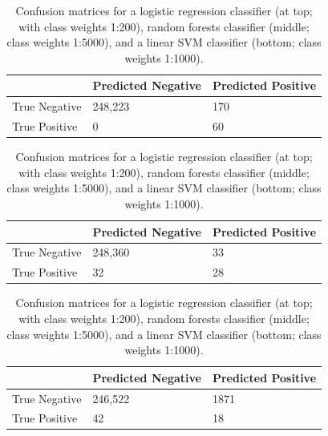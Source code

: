 \begin{table}[t]
\centering
\begin{tabular}{@{}lll@{}}
\toprule
              & Predicted Negative & Predicted Positive \\ \midrule
True Negative & 248,223             & 170                \\
True Positive & 0                  & 60                 \\ \bottomrule
\end{tabular}

\begin{tabular}{@{}lll@{}}
\toprule
              & Predicted Negative & Predicted Positive \\ \midrule
True Negative & 248,360             & 33                 \\
True Positive & 32                 & 28                 \\ \bottomrule
\end{tabular}

\begin{tabular}{@{}lll@{}}
\toprule
              & Predicted Negative & Predicted Positive \\ \midrule
True Negative & 246,522             & 1871               \\
True Positive & 42                 & 18                 \\ \bottomrule
\end{tabular}
\caption{Confusion matrices for a logistic regression classifier (at top; with class weights 1:200), random forests classifier (middle; class weights 1:5000), and a linear SVM classifier (bottom; class weights 1:1000).}
\label{fig:cmat}
\end{table}



